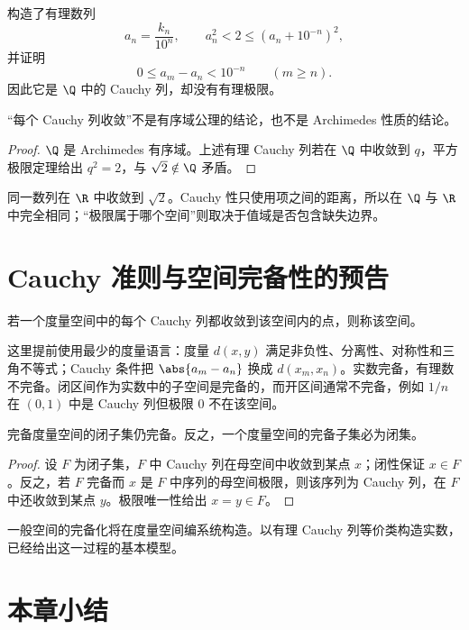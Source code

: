 构造了有理数列
\[
 a_n=\frac{k_n}{10^n},\qquad
 a_n^2<2\le(a_n+10^{-n})^2,
\]
并证明
\[
 0\le a_m-a_n<10^{-n}\qquad(m\ge n).
\]
因此它是 \(\Q\) 中的 Cauchy 列，却没有有理极限。

\begin{theorem}
“每个 Cauchy 列收敛”不是有序域公理的结论，也不是 Archimedes 性质的结论。
\end{theorem}

\begin{proof}
\(\Q\) 是 Archimedes 有序域。上述有理 Cauchy 列若在 \(\Q\) 中收敛到 \(q\)，平方极限定理给出 \(q^2=2\)，与 \(\sqrt2\notin\Q\) 矛盾。
\end{proof}

同一数列在 \(\R\) 中收敛到 \(\sqrt2\)。Cauchy 性只使用项之间的距离，所以在 \(\Q\) 与 \(\R\) 中完全相同；“极限属于哪个空间”则取决于值域是否包含缺失边界。

\section{Cauchy 准则与空间完备性的预告}

\begin{definition}
若一个度量空间中的每个 Cauchy 列都收敛到该空间内的点，则称该空间。
\end{definition}

这里提前使用最少的度量语言：度量 \(d(x,y)\) 满足非负性、分离性、对称性和三角不等式；Cauchy 条件把
\(\abs{a_m-a_n}\) 换成 \(d(x_m,x_n)\)。实数完备，有理数不完备。闭区间作为实数中的子空间是完备的，而开区间通常不完备，例如 \(1/n\) 在 \((0,1)\) 中是 Cauchy 列但极限 \(0\) 不在该空间。

\begin{proposition}
完备度量空间的闭子集仍完备。反之，一个度量空间的完备子集必为闭集。
\end{proposition}

\begin{proof}
设 \(F\) 为闭子集，\(F\) 中 Cauchy 列在母空间中收敛到某点 \(x\)；闭性保证 \(x\in F\)。反之，若 \(F\) 完备而 \(x\) 是 \(F\) 中序列的母空间极限，则该序列为 Cauchy 列，在 \(F\) 中还收敛到某点 \(y\)。极限唯一性给出 \(x=y\in F\)。
\end{proof}

一般空间的完备化将在度量空间编系统构造。以有理 Cauchy 列等价类构造实数，已经给出这一过程的基本模型。

\section*{本章小结}

